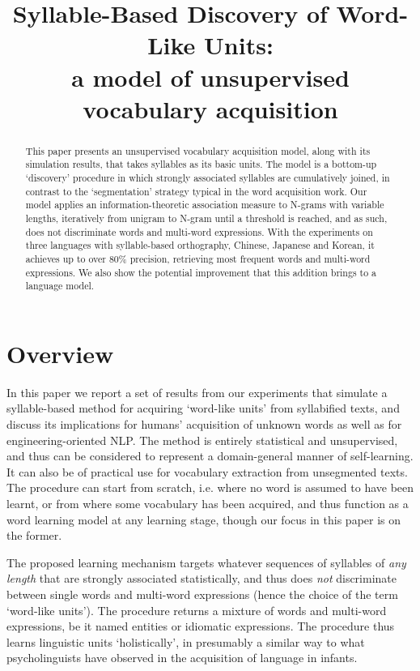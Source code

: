 \documentclass[a4]{article}
\title{Syllable-Based Discovery of Word-Like Units:\\a model of unsupervised vocabulary acquisition}
\begin{document}
\maketitle

\begin{abstract}

This paper presents an unsupervised vocabulary acquisition model, along with its simulation results, that takes syllables as its basic units. The model is a bottom-up `discovery' procedure in which strongly associated syllables are cumulatively joined, in contrast to the `segmentation' strategy typical in the word acquisition work. Our model applies an information-theoretic association measure to N-grams with variable lengths, iteratively from unigram to N-gram until a threshold is reached, and as such, does not discriminate words and multi-word expressions. With the experiments on three languages with syllable-based orthography, Chinese, Japanese and Korean, it achieves up to over 80\% precision, retrieving most frequent words and multi-word expressions. We also show the potential improvement that this addition brings to a language model.

\end{abstract}

\section{Overview}

In this paper we report a set of results from our experiments that simulate a syllable-based method for acquiring `word-like units' from syllabified texts, and discuss its implications for humans' acquisition of unknown words as well as for engineering-oriented NLP. The method is entirely statistical and unsupervised, and thus can be considered to represent a domain-general manner of self-learning. It can also be of practical use for vocabulary extraction from unsegmented texts. The procedure can start from scratch, i.e. where no word is assumed to have been learnt, or from where some vocabulary has been acquired, and thus function as a word learning model at any learning stage, though our focus in this paper is on the former.

The proposed learning mechanism targets whatever sequences of syllables of \emph{any length} that are strongly associated statistically, and thus does \emph{not} discriminate between single words and multi-word expressions (hence the choice of the term `word-like units'). The procedure returns a mixture of words and multi-word expressions, be it named entities or idiomatic expressions. The procedure thus learns linguistic units `holistically', in presumably a similar way to what psycholinguists have observed in the acquisition of language in infants.
\end{document}
